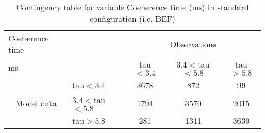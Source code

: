 
\begin{table}[]
\begin{center}
\begin{tabular}{llccc}
\hline
{Coeherence time}                                       &                                                    & \multicolumn{3}{c}{Observations}                 \\
{ms}                                       &                             & tau$<3.4$   & $3.4<$tau$<5.8$ & tau$>5.8$ \\
\hline
\multicolumn{1}{c}{\multirow{3}{*}{Model data}}  & tau$<3.4$          & 3678                & 872                       & 99              \\
                                                 & $3.4<$tau$<5.8$ & 1794                & 3570                       & 2015              \\
                                                 & tau$>5.8$          & 281                & 1311                       & 3639              \\
\hline
\end{tabular}
\end{center}
\caption{Contingency table for variable Coeherence time (ms) in standard configuration (i.e. BEF)}
\label{tab:contingency}
\end{table}
